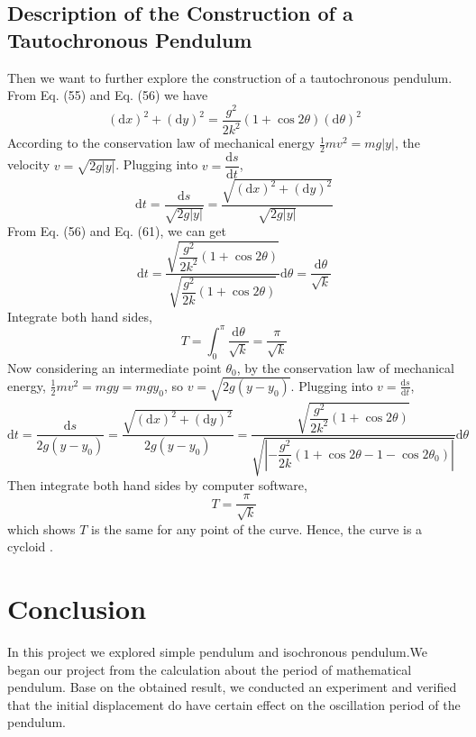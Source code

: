 \documentclass[12pt]{report}
\begin{document}
\subsection{Description of the Construction of a Tautochronous Pendulum}
Then we want to further explore the construction of a tautochronous pendulum. From Eq. (55) and Eq. (56) we have
\begin{equation}
    (\mathrm{d}x)^2+(\mathrm{d}y)^2=\dfrac{g^2}{2k^2}(1+\cos{2\theta})(\mathrm{d}\theta)^2
\end{equation}
According to the conservation law of mechanical energy $\frac{1}{2}mv^2=mg|y|$, the velocity $v=\sqrt{2g|y|}$. Plugging into $v=\dfrac{\mathrm{d}s}{\mathrm{d}t}$,
\begin{equation}
    \mathrm{d}t=\dfrac{\mathrm{d}s}{\sqrt{2g|y|}}=\dfrac{\sqrt{(\mathrm{d}x)^2+(\mathrm{d}y)^2}}{\sqrt{2g|y|}}
\end{equation}
From Eq. (56) and Eq. (61), we can get
\begin{equation}
    \mathrm{d}t=\dfrac{\sqrt{\dfrac{g^2}{2k^2}(1+\cos{2\theta})}}{\sqrt{\dfrac{g^2}{2k}(1+\cos{2\theta})}}\mathrm{d}\theta=\dfrac{\mathrm{d}\theta}{\sqrt{k}}
\end{equation}
Integrate both hand sides,
\begin{equation}
    T=\int_0^{\pi}\dfrac{\mathrm{d}\theta}{\sqrt{k}}=\dfrac{\pi}{\sqrt{k}}
\end{equation}
Now considering an intermediate point $\theta_0$, by the conservation law of mechanical energy, $\frac{1}{2}mv^2=mgy=mgy_0$, so $v=\sqrt{2g(y-y_0)}$. Plugging into $v=\frac{\mathrm{d}s}{\mathrm{d}t}$,
\begin{equation}
    \mathrm{d}t=\dfrac{\mathrm{d}s}{2g(y-y_0)}=\dfrac{\sqrt{(\mathrm{d}x)^2+(\mathrm{d}y)^2}}{2g(y-y_0)}=\dfrac{\sqrt{\dfrac{g^2}{2k^2}(1+\cos{2\theta})}}{\sqrt{\left|-\dfrac{g^2}{2k}(1+\cos{2\theta}-1-\cos{2\theta_0})\right|}}\mathrm{d}\theta
\end{equation}
Then integrate both hand sides by computer software,
\begin{equation}
    T=\dfrac{\pi}{\sqrt{k}}
\end{equation}
which shows $T$ is the same for any point of the curve. Hence, the curve is a cycloid \cite{Weisstein2019}.
\section{Conclusion}
In this project we explored simple pendulum and isochronous pendulum.We began our project from the calculation about the period of mathematical pendulum. Base on the obtained result, we conducted an experiment and verified that the initial displacement do have certain effect on the oscillation period of the pendulum.
\end{document}
